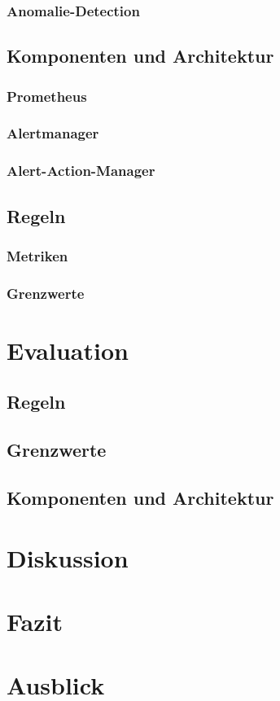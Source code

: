 \documentclass[a4paper,12pt]{scrartcl}
\begin{document}
\subsubsection{Anomalie-Detection}
\subsection{Komponenten und Architektur}
\subsubsection{Prometheus}
\subsubsection{Alertmanager}
\subsubsection{Alert-Action-Manager}
\subsection{Regeln}
\subsubsection{Metriken}
\subsubsection{Grenzwerte}

\section{Evaluation}
\subsection{Regeln}
\subsection{Grenzwerte}
\subsection{Komponenten und Architektur}

\section{Diskussion}

\section{Fazit}

\section{Ausblick}
\end{document}
